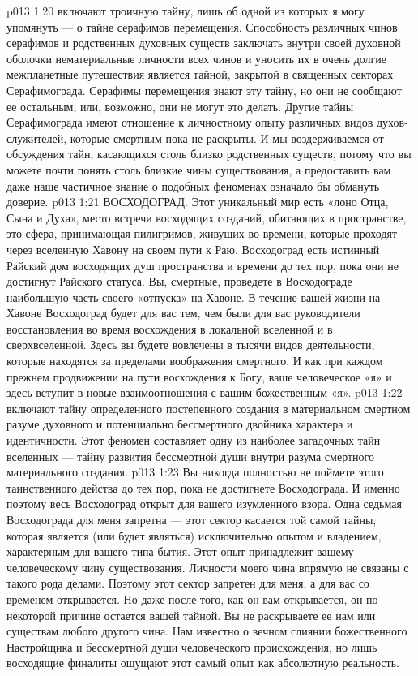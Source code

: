 \vs p013 1:20 \pc {} включают троичную тайну, лишь об одной из которых я могу упомянуть --- о тайне серафимов перемещения. Способность различных чинов серафимов и родственных духовных существ заключать внутри своей духовной оболочки нематериальные личности всех чинов и уносить их в очень долгие межпланетные путешествия является тайной, закрытой в священных секторах Серафимограда. Серафимы перемещения знают эту тайну, но они не сообщают ее остальным, или, возможно, они не могут это делать. Другие тайны Серафимограда имеют отношение к личностному опыту различных видов духов\hyp{}служителей, которые смертным пока не раскрыты. И мы воздерживаемся от обсуждения тайн, касающихся столь близко родственных существ, потому что вы можете почти понять столь близкие чины существования, а предоставить вам даже наше частичное знание о подобных феноменах означало бы обмануть доверие.
\vs p013 1:21 \pc {}\bibnobreakspace ВОСХОДОГРАД. Этот уникальный мир есть «лоно Отца, Сына и Духа», место встречи восходящих созданий, обитающих в пространстве, это сфера, принимающая пилигримов, живущих во времени, которые проходят через вселенную Хавону на своем пути к Раю. Восходоград есть истинный Райский дом восходящих душ пространства и времени до тех пор, пока они не достигнут Райского статуса. Вы, смертные, проведете в Восходограде наибольшую часть своего «отпуска» на Хавоне. В течение вашей жизни на Хавоне Восходоград будет для вас тем, чем были для вас руководители восстановления во время восхождения в локальной вселенной и в сверхвселенной. Здесь вы будете вовлечены в тысячи видов деятельности, которые находятся за пределами воображения смертного. И как при каждом прежнем продвижении на пути восхождения к Богу, ваше человеческое «я» и здесь вступит в новые взаимоотношения с вашим божественным «я».
\vs p013 1:22 \pc {} включают тайну определенного постепенного создания в материальном смертном разуме духовного и потенциально бессмертного двойника характера и идентичности. Этот феномен составляет одну из наиболее загадочных тайн вселенных --- тайну развития бессмертной души внутри разума смертного материального создания.
\vs p013 1:23 Вы никогда полностью не поймете этого таинственного действа до тех пор, пока не достигнете Восходограда. И именно поэтому весь Восходоград открыт для вашего изумленного взора. Одна седьмая Восходограда для меня запретна --- этот сектор касается той самой тайны, которая является (или будет являться) исключительно опытом и владением, характерным для вашего типа бытия. Этот опыт принадлежит вашему человеческому чину существования. Личности моего чина впрямую не связаны с такого рода делами. Поэтому этот сектор запретен для меня, а для вас со временем открывается. Но даже после того, как он вам открывается, он по некоторой причине остается вашей тайной. Вы не раскрываете ее нам или существам любого другого чина. Нам известно о вечном слиянии божественного Настройщика и бессмертной души человеческого происхождения, но лишь восходящие финалиты ощущают этот самый опыт как абсолютную реальность.

